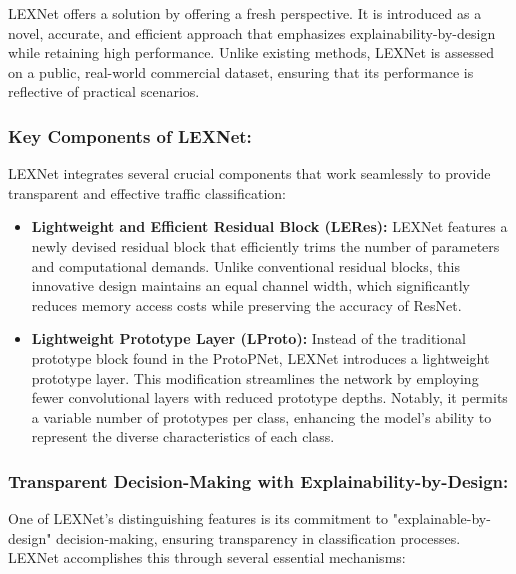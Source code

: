 \documentclass{article}
\begin{document}
LEXNet offers a solution by offering a fresh perspective. It is introduced as a novel, accurate, and efficient approach that emphasizes explainability-by-design while retaining high performance. Unlike existing methods, LEXNet is assessed on a public, real-world commercial dataset, ensuring that its performance is reflective of practical scenarios.

\subsubsection{Key Components of LEXNet:}

LEXNet integrates several crucial components that work seamlessly to provide transparent and effective traffic classification:

\begin{itemize}

    \item \textbf{Lightweight and Efficient Residual Block (LERes):} LEXNet features a newly devised residual block that efficiently trims the number of parameters and computational demands. Unlike conventional residual blocks, this innovative design maintains an equal channel width, which significantly reduces memory access costs while preserving the accuracy of ResNet.

    \item \textbf{Lightweight Prototype Layer (LProto):} Instead of the traditional prototype block found in the ProtoPNet, LEXNet introduces a lightweight prototype layer. This modification streamlines the network by employing fewer convolutional layers with reduced prototype depths. Notably, it permits a variable number of prototypes per class, enhancing the model's ability to represent the diverse characteristics of each class.

\end{itemize}

\subsubsection{Transparent Decision-Making with Explainability-by-Design:}

One of LEXNet's distinguishing features is its commitment to "explainable-by-design" decision-making, ensuring transparency in classification processes. LEXNet accomplishes this through several essential mechanisms:
\end{document}
